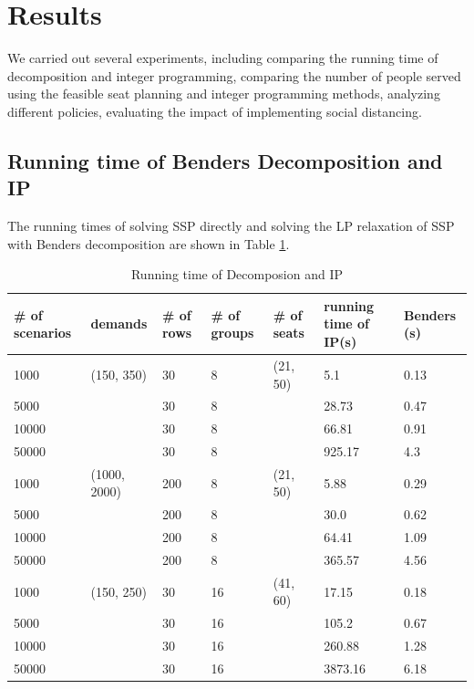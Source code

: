 \section{Results}
We carried out several experiments, including comparing the running time of decomposition and integer programming, comparing the number of people served using the feasible seat planning and integer programming methods, analyzing different policies, evaluating the impact of implementing social distancing.



\subsection{Running time of Benders Decomposition and IP}\label{Bender_IP}

The running times of solving SSP directly and solving the LP relaxation of SSP with Benders decomposition are shown in Table \ref{tab_1}.

\begin{table}[ht]
  \centering
  \scriptsize
  \caption{Running time of Decomposion and IP}\label{tab_1}
  \begin{tabular}{|l|l|l|l|l|l|l|}
  \hline
  \# of scenarios & demands & \# of rows & \# of groups & \# of seats & running time of IP(s) & Benders (s) \\
  \hline
  1000  & (150, 350) & 30 & 8 & (21, 50) & 5.1  & 0.13 \\
  5000  &            & 30 & 8 &         & 28.73 & 0.47  \\
  10000 &            & 30 & 8 &         & 66.81  & 0.91 \\
  50000 &            & 30 & 8 &         & 925.17 & 4.3 \\
  \hline
  1000  & (1000, 2000) & 200 & 8 & (21, 50) & 5.88 & 0.29 \\
  5000  &              & 200 & 8 &          & 30.0 & 0.62 \\
  10000 &              & 200 & 8 &          & 64.41 & 1.09 \\
  50000 &              & 200 & 8 &          & 365.57 & 4.56\\
  \hline
  1000  & (150, 250) & 30 & 16 & (41, 60) & 17.15  & 0.18 \\
  5000  &            & 30 & 16 &          & 105.2  & 0.67 \\
  10000 &            & 30 & 16 &          & 260.88 & 1.28 \\
  50000 &            & 30 & 16 &          & 3873.16 & 6.18 \\
  \hline
  \end{tabular}
\end{table}

